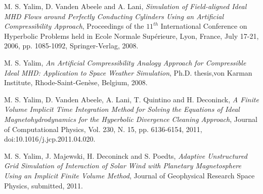 \documentclass[11pt]{article}
\begin{document}
\begin{thebibliography}{00}
  M. S. Yalim, D. Vanden Abeele and A. Lani, 
  {\it Simulation of Field-aligned Ideal MHD Flows around Perfectly Conducting Cylinders Using an Artificial Compressibility Approach}, 
  Proceedings of the $11^{th}$ International Conference on Hyperbolic Problems held in Ecole Normale Sup\'erieure, Lyon, France, July 17-21, 2006, pp. 1085-1092, Springer-Verlag, 2008.

  M. S. Yalim, {\it An Artificial Compressibility Analogy Approach for Compressible Ideal MHD: Application to Space Weather Simulation},
  Ph.D. thesis,von Karman Institute, Rhode-Saint-Gen\`ese, Belgium, 2008.

  M. S. Yalim, D. Vanden Abeele, A. Lani, T. Quintino and H. Deconinck,
  {\it A Finite Volume Implicit Time Integration Method for Solving the Equations of Ideal Magnetohydrodynamics for the Hyperbolic Divergence Cleaning Approach},
  Journal of Computational Physics, Vol. 230, N. 15, pp. 6136-6154, 2011, doi:10.1016/j.jcp.2011.04.020.

  M. S. Yalim, J. Majewski, H. Deconinck and S. Poedts,
  {\it Adaptive Unstructured Grid Simulation of Interaction of Solar Wind with Planetary Magnetosphere Using an Implicit Finite Volume Method},
  Journal of Geophysical Research Space Physics, submitted, 2011.
  
\end{thebibliography}
\end{document}
